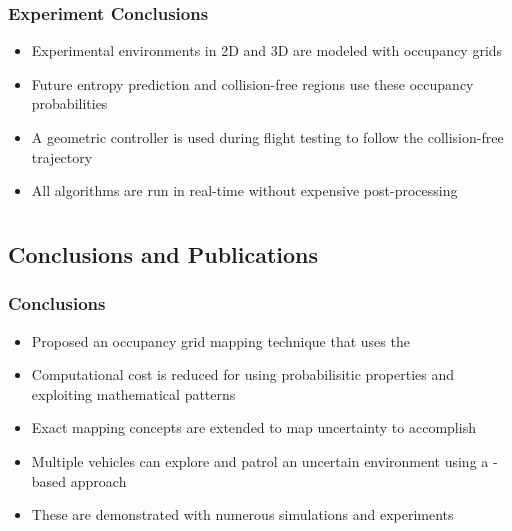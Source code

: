 \documentclass[11pt,professionalfonts,hyperref={pdftex,pdfpagemode=none,pdfstartview=FitH}]{beamer}
\renewcommand{\emph}[1]{\textit{\textbf{\color{blue}{#1}}}}
\begin{document}
%
%
%
%


\begin{frame}
\frametitle{Experiment Conclusions}
\begin{itemize}
        	\item Experimental environments in 2D and 3D are modeled with occupancy grids
	\item Future entropy prediction and collision-free regions use these occupancy probabilities
	\item A geometric controller is used during flight testing to follow the collision-free trajectory
	\item All algorithms are run in real-time without expensive post-processing 
\end{itemize}
\end{frame}

\section*{}
\subsection*{Conclusions and Publications}

\begin{frame}
\frametitle{Conclusions}
\begin{itemize}
        	\item Proposed an occupancy grid mapping technique that uses the \emph{exact probabilistic solution}
	\item Computational cost is reduced \emph{substantially} for \emph{real-time implementation} using probabilisitic properties and exploiting mathematical patterns
	\item Exact mapping concepts are extended to map uncertainty to accomplish \emph{autonomous exploration}
	\item Multiple vehicles can explore and patrol an uncertain environment using a \emph{bidding}-based approach
	\item These are demonstrated with numerous simulations and experiments
\end{itemize}
\end{frame}
\end{document}
